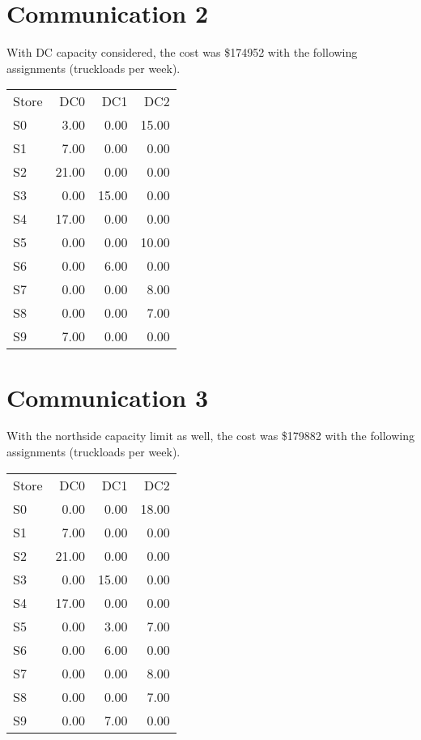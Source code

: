 \documentclass[11pt,a4paper]{article}
\begin{document}
\section{Communication 2}
With DC capacity considered, the cost was  \$174952 with 
the following assignments (truckloads per week). \\[0.8em]
\begin{tabular}{l  r  r  r }
    Store & DC0 & DC1 & DC2 \\
S0 & 3.00 & 0.00 & 15.00 \\
S1 & 7.00 & 0.00 & 0.00 \\
S2 & 21.00 & 0.00 & 0.00 \\
S3 & 0.00 & 15.00 & 0.00 \\
S4 & 17.00 & 0.00 & 0.00 \\
S5 & 0.00 & 0.00 & 10.00 \\
S6 & 0.00 & 6.00 & 0.00 \\
S7 & 0.00 & 0.00 & 8.00 \\
S8 & 0.00 & 0.00 & 7.00 \\
S9 & 7.00 & 0.00 & 0.00 \\
\end{tabular}

\section{Communication 3}
With the northside capacity limit as well, the cost was \$179882 with the following 
assignments (truckloads per week).\\[0.8em]
\begin{tabular}{l r r r}
    Store & DC0 & DC1 & DC2 \\
S0 & 0.00 & 0.00 & 18.00 \\
S1 & 7.00 & 0.00 & 0.00 \\
S2 & 21.00 & 0.00 & 0.00 \\
S3 & 0.00 & 15.00 & 0.00 \\
S4 & 17.00 & 0.00 & 0.00 \\
S5 & 0.00 & 3.00 & 7.00 \\
S6 & 0.00 & 6.00 & 0.00 \\
S7 & 0.00 & 0.00 & 8.00 \\
S8 & 0.00 & 0.00 & 7.00 \\
S9 & 0.00 & 7.00 & 0.00 \\
\end{tabular}
\pagebreak
\end{document}
